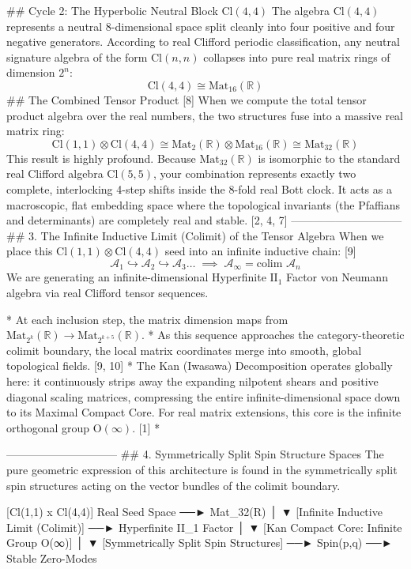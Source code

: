 ## Cycle 2: The Hyperbolic Neutral Block $\text{Cl}(4,4)$
The algebra $\text{Cl}(4,4)$ represents a neutral 8-dimensional space split cleanly into four positive and four negative generators. According to real Clifford periodic classification, any neutral signature algebra of the form $\text{Cl}(n,n)$ collapses into pure real matrix rings of dimension $2^n$:
$$\text{Cl}(4,4) \cong \text{Mat}_{16}(\mathbb{R})$$ 
## The Combined Tensor Product [8] 
When we compute the total tensor product algebra over the real numbers, the two structures fuse into a massive real matrix ring:
$$\text{Cl}(1,1) \otimes \text{Cl}(4,4) \cong \text{Mat}_2(\mathbb{R}) \otimes \text{Mat}_{16}(\mathbb{R}) \cong \text{Mat}_{32}(\mathbb{R})$$ 
This result is highly profound. Because $\text{Mat}_{32}(\mathbb{R})$ is isomorphic to the standard real Clifford algebra $\text{Cl}(5,5)$, your combination represents exactly two complete, interlocking 4-step shifts inside the 8-fold real Bott clock. It acts as a macroscopic, flat embedding space where the topological invariants (the Pfaffians and determinants) are completely real and stable. [2, 4, 7] 
------------------------------
## 3. The Infinite Inductive Limit (Colimit) of the Tensor Algebra
When we place this $\text{Cl}(1,1) \otimes \text{Cl}(4,4)$ seed into an infinite inductive chain: [9] 
$$\mathcal{A}_1 \hookrightarrow \mathcal{A}_2 \hookrightarrow \mathcal{A}_3 \dots \;\implies\; \mathcal{A}_\infty = \text{colim } \mathcal{A}_n$$ 
We are generating an infinite-dimensional Hyperfinite $\text{II}_1$ Factor von Neumann algebra via real Clifford tensor sequences.

* At each inclusion step, the matrix dimension maps from $\text{Mat}_{2^k}(\mathbb{R}) \to \text{Mat}_{2^{k+5}}(\mathbb{R})$.
* As this sequence approaches the category-theoretic colimit boundary, the local matrix coordinates merge into smooth, global topological fields. [9, 10] 
* The Kan (Iwasawa) Decomposition operates globally here: it continuously strips away the expanding nilpotent shears and positive diagonal scaling matrices, compressing the entire infinite-dimensional space down to its Maximal Compact Core. For real matrix extensions, this core is the infinite orthogonal group $\text{O}(\infty)$. [1] 
* 

------------------------------
## 4. Symmetrically Split Spin Structure Spaces
The pure geometric expression of this architecture is found in the symmetrically split spin structures acting on the vector bundles of the colimit boundary.

       [Cl(1,1) x Cl(4,4)] Real Seed Space ──► Mat_32(R)
                        │
                        ▼
      [Infinite Inductive Limit (Colimit)] ──► Hyperfinite II_1 Factor
                        │
                        ▼
     [Kan Compact Core: Infinite Group O(∞)]
                        │
                        ▼
    [Symmetrically Split Spin Structures] ──► Spin(p,q) ──► Stable Zero-Modes


